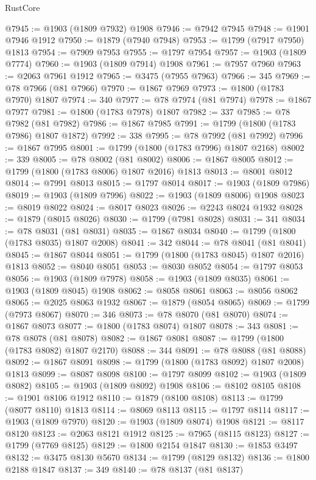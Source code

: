 \begin{lexlean}{RustCore}
\begin{coremodule}
@7945 := @1903 (@1809 @7932) @1908
@7946 := @7942 @7945
@7948 := @1901 @7946 @1912
@7950 := @1879 (@7940 @7948)
@7953 := @1799 (@7917 @7950) @1813
@7954 := @7909 @7953
@7955 := @1797 @7954
@7957 := @1903 (@1809 @7774)
@7960 := @1903 (@1809 @7914) @1908
@7961 := @7957 @7960
@7963 := @2063 @7961 @1912
@7965 := @3475 (@7955 @7963)
@7966 := 345
@7969 := @78 @7966 (@81 @7966)
@7970 := @1867 @7969
@7973 := @1800 (@1783 @7970) @1807
@7974 := 340
@7977 := @78 @7974 (@81 @7974)
@7978 := @1867 @7977
@7981 := @1800 (@1783 @7978) @1807
@7982 := 337
@7985 := @78 @7982 (@81 @7982)
@7986 := @1867 @7985
@7991 := @1799 (@1800 (@1783 @7986) @1807 @1872)
@7992 := 338
@7995 := @78 @7992 (@81 @7992)
@7996 := @1867 @7995
@8001 := @1799 (@1800 (@1783 @7996) @1807 @2168)
@8002 := 339
@8005 := @78 @8002 (@81 @8002)
@8006 := @1867 @8005
@8012 := @1799 (@1800 (@1783 @8006) @1807 @2016) @1813
@8013 := @8001 @8012
@8014 := @7991 @8013
@8015 := @1797 @8014
@8017 := @1903 (@1809 @7986)
@8019 := @1903 (@1809 @7996)
@8022 := @1903 (@1809 @8006) @1908
@8023 := @8019 @8022
@8024 := @8017 @8023
@8026 := @2243 @8024 @1932
@8028 := @1879 (@8015 @8026)
@8030 := @1799 (@7981 @8028)
@8031 := 341
@8034 := @78 @8031 (@81 @8031)
@8035 := @1867 @8034
@8040 := @1799 (@1800 (@1783 @8035) @1807 @2008)
@8041 := 342
@8044 := @78 @8041 (@81 @8041)
@8045 := @1867 @8044
@8051 := @1799 (@1800 (@1783 @8045) @1807 @2016) @1813
@8052 := @8040 @8051
@8053 := @8030 @8052
@8054 := @1797 @8053
@8056 := @1903 (@1809 @7978)
@8058 := @1903 (@1809 @8035)
@8061 := @1903 (@1809 @8045) @1908
@8062 := @8058 @8061
@8063 := @8056 @8062
@8065 := @2025 @8063 @1932
@8067 := @1879 (@8054 @8065)
@8069 := @1799 (@7973 @8067)
@8070 := 346
@8073 := @78 @8070 (@81 @8070)
@8074 := @1867 @8073
@8077 := @1800 (@1783 @8074) @1807
@8078 := 343
@8081 := @78 @8078 (@81 @8078)
@8082 := @1867 @8081
@8087 := @1799 (@1800 (@1783 @8082) @1807 @2170)
@8088 := 344
@8091 := @78 @8088 (@81 @8088)
@8092 := @1867 @8091
@8098 := @1799 (@1800 (@1783 @8092) @1807 @2008) @1813
@8099 := @8087 @8098
@8100 := @1797 @8099
@8102 := @1903 (@1809 @8082)
@8105 := @1903 (@1809 @8092) @1908
@8106 := @8102 @8105
@8108 := @1901 @8106 @1912
@8110 := @1879 (@8100 @8108)
@8113 := @1799 (@8077 @8110) @1813
@8114 := @8069 @8113
@8115 := @1797 @8114
@8117 := @1903 (@1809 @7970)
@8120 := @1903 (@1809 @8074) @1908
@8121 := @8117 @8120
@8123 := @2063 @8121 @1912
@8125 := @7965 (@8115 @8123)
@8127 := @1799 (@7769 @8125)
@8129 := @1800 @2154 @1847
@8130 := @1853 @3497
@8132 := @3475 @8130 @5670
@8134 := @1799 (@8129 @8132)
@8136 := @1800 @2188 @1847
@8137 := 349
@8140 := @78 @8137 (@81 @8137)

\end{coremodule}
\end{lexlean}
